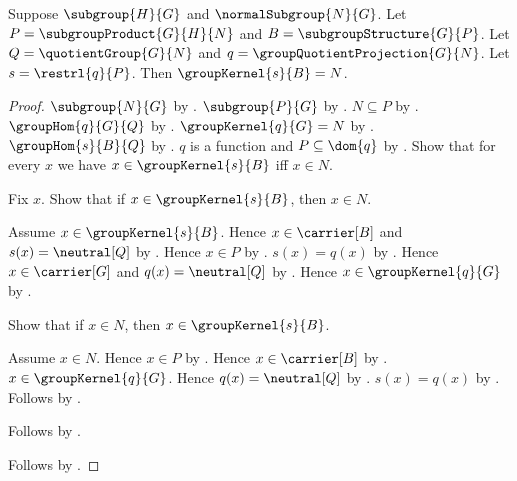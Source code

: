 \begin{theorem}\label{group_second_isomorphism_ambient_restriction_kernel}
    Suppose $\subgroup{H}{G}$ and $\normalSubgroup{N}{G}$.
    Let $P=\subgroupProduct{G}{H}{N}$ and
        $B=\subgroupStructure{G}{P}$.
    Let $Q=\quotientGroup{G}{N}$ and
        $q=\groupQuotientProjection{G}{N}$.
    Let $s=\restrl{q}{P}$.
    Then $\groupKernel{s}{B}=N$.
\end{theorem}
\begin{proof}
    $\subgroup{N}{G}$ by .
    $\subgroup{P}{G}$ by .
    $N\subseteq P$ by
        .
    $\groupHom{q}{G}{Q}$ by
        .
    $\groupKernel{q}{G}=N$ by
        .
    $\groupHom{s}{B}{Q}$ by
        .
    $q$ is a function and $P\subseteq\dom{q}$ by
        .
    Show that for every $x$ we have
        $x\in\groupKernel{s}{B}$ iff $x\in N$.
    \begin{subproof}
        Fix $x$.
        Show that if $x\in\groupKernel{s}{B}$, then $x\in N$.
        \begin{subproof}
            Assume $x\in\groupKernel{s}{B}$.
            Hence $x\in\carrier[B]$ and $s(x)=\neutral[Q]$ by
                .
            Hence $x\in P$ by .
            $s(x)=q(x)$ by .
            Hence $x\in\carrier[G]$ and $q(x)=\neutral[Q]$ by
                .
            Hence $x\in\groupKernel{q}{G}$ by
                .
        \end{subproof}
        Show that if $x\in N$, then $x\in\groupKernel{s}{B}$.
        \begin{subproof}
            Assume $x\in N$.
            Hence $x\in P$ by .
            Hence $x\in\carrier[B]$ by
                .
            $x\in\groupKernel{q}{G}$.
            Hence $q(x)=\neutral[Q]$ by
                .
            $s(x)=q(x)$ by .
            Follows by .
        \end{subproof}
        Follows by \auto.
    \end{subproof}
    Follows by .
\end{proof}

